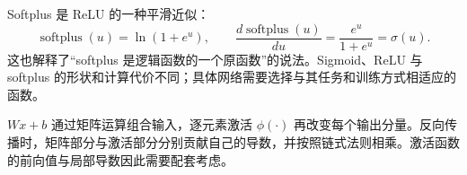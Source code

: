 Softplus 是 ReLU 的一种平滑近似：
\begin{equation}
 \operatorname{softplus}(u)=\ln(1+e^u),\qquad
 \frac{d\operatorname{softplus}(u)}{du}
 =\frac{e^u}{1+e^u}=\sigma(u).
 \label{l10:eq:softplus}
\end{equation}
这也解释了“softplus 是逻辑函数的一个原函数”的说法。Sigmoid、ReLU 与 softplus 的形状和计算代价不同；具体网络需要选择与其任务和训练方式相适应的函数。

\begin{keybox}[title={一层中的两类计算}]
$Wx+b$ 通过矩阵运算组合输入，逐元素激活 $\phi(\cdot)$ 再改变每个输出分量。反向传播时，矩阵部分与激活部分分别贡献自己的导数，并按照链式法则相乘。激活函数的前向值与局部导数因此需要配套考虑。
\end{keybox}
